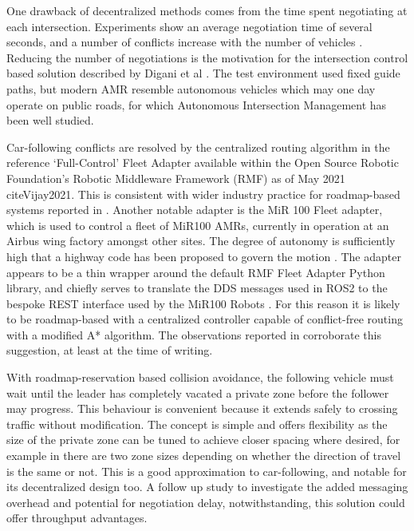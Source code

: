 \documentclass[runningheads]{llncs}
\begin{document}
One drawback of decentralized methods comes from the time spent negotiating at each intersection. Experiments show an average negotiation time of several seconds, and a number of conflicts increase with the number of vehicles \cite{Draganjac2020}. Reducing the number of negotiations is the motivation for the intersection control based solution described by Digani et al \cite{Digani2019}. The test environment used fixed guide paths, but modern AMR resemble autonomous vehicles which may one day operate on public roads, for which Autonomous Intersection Management has been well studied. 

Car-following conflicts are resolved by the centralized routing algorithm in the reference `Full-Control' Fleet Adapter available within the Open Source Robotic Foundation's Robotic Middleware Framework (RMF) as of May 2021 cite{Vijay2021}. This is consistent with wider industry practice for roadmap-based systems reported in \cite{Fragapane2021}. Another notable adapter is the MiR 100 Fleet adapter, which is used to control a fleet of  MiR100 AMRs, currently in operation at an Airbus wing factory amongst other sites. The degree of autonomy is sufficiently high that a highway code has been proposed to govern the motion \cite{Liaqat2019}. The adapter appears to be a thin wrapper around the default RMF Fleet Adapter Python library, and chiefly serves to translate the DDS messages used in ROS2 \cite{Eros2019} to the bespoke REST interface used by the MiR100 Robots \cite{Grey2021}. For this reason it is likely to be roadmap-based with a centralized controller capable of conflict-free routing with a modified A* algorithm. The observations reported in \cite{Liaqat2019} corroborate this suggestion, at least at the time of writing.

With roadmap-reservation based collision avoidance, the following vehicle must wait until the leader has completely vacated a private zone before the follower may progress. This behaviour is convenient because it extends safely to crossing traffic without modification. The concept is simple and offers flexibility as the size of the private zone can be tuned to achieve closer spacing where desired, for example in \cite{Walenta2017} there are two zone sizes depending on whether the direction of travel is the same or not. This is a good approximation to car-following, and notable for its decentralized design too. A follow up study to investigate the added messaging overhead and potential for negotiation delay, notwithstanding, this solution could offer throughput advantages.
\end{document}
